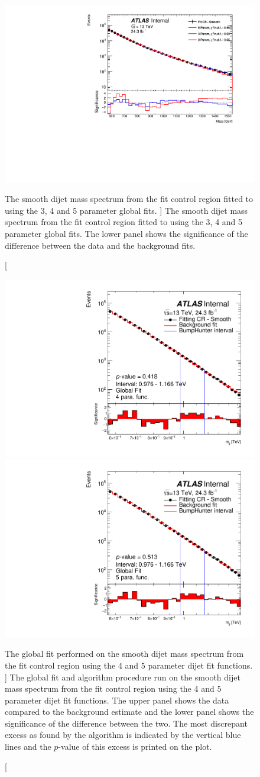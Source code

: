 \begin{figure}[!htb]
\centering
\includegraphics[width=0.6\linewidth, angle=0]{figs/Dibjet/LowMass/FitStudy_min566/globalFit_lm_dh.pdf}
\caption
    [ The smooth dijet mass spectrum from the \lm{} fit control region
      fitted to using the 3, 4 and 5 parameter global fits.
    ]
    {\label{fig:lowmass_globalFit}
      The smooth dijet mass spectrum from the \lm{} fit control region
      fitted to using the 3, 4 and 5 parameter global fits.
      The lower panel shows the significance of the difference between the data and the background fits.}
\end{figure}
\begin{figure}[!htb]

\captionsetup[subfigure]{aboveskip=0pt,justification=centering}
\centering
{} {
  \includegraphics[width=0.45\linewidth, angle=0]{figs/Dibjet/LowMass/FitStudy_min566/globalFit_lm_bH_4para.pdf}
}
 {
  \includegraphics[width=0.45\linewidth, angle=0]{figs/Dibjet/LowMass/FitStudy_min566/globalFit_lm_bH_5para.pdf}
}
\caption
    [The global fit performed on the smooth dijet mass spectrum from the \lm{} fit control region
      using the 4 and 5 parameter dijet fit functions.
    ]
    {\label{fig:bhFit_lm_global}
      The global fit and \bh{} algorithm procedure run on the smooth dijet mass spectrum from the \lm{} fit control region
      using the 4 and 5 parameter dijet fit functions.
      The upper panel shows the data compared to the background estimate and the lower panel shows the significance of the difference between the two.
      The most discrepant excess as found by the \bh{} algorithm is indicated by the vertical blue lines and the \mbox{$p$-value} of this excess is printed on the plot. }
\end{figure}

